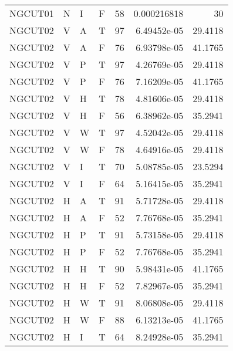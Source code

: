 \begin{longtable}{llllrrr}
    NGCUT01  & N         & I         & F          & 58         & 0.000216818 & 30       \\
    NGCUT02  & V         & A         & T          & 97         & 6.49452e-05 & 29.4118  \\
    NGCUT02  & V         & A         & F          & 76         & 6.93798e-05 & 41.1765  \\
    NGCUT02  & V         & P         & T          & 97         & 4.26769e-05 & 29.4118  \\
    NGCUT02  & V         & P         & F          & 76         & 7.16209e-05 & 41.1765  \\
    NGCUT02  & V         & H         & T          & 78         & 4.81606e-05 & 29.4118  \\
    NGCUT02  & V         & H         & F          & 56         & 6.38962e-05 & 35.2941  \\
    NGCUT02  & V         & W         & T          & 97         & 4.52042e-05 & 29.4118  \\
    NGCUT02  & V         & W         & F          & 78         & 4.64916e-05 & 29.4118  \\
    NGCUT02  & V         & I         & T          & 70         & 5.08785e-05 & 23.5294  \\
    NGCUT02  & V         & I         & F          & 64         & 5.16415e-05 & 35.2941  \\
    NGCUT02  & H         & A         & T          & 91         & 5.71728e-05 & 29.4118  \\
    NGCUT02  & H         & A         & F          & 52         & 7.76768e-05 & 35.2941  \\
    NGCUT02  & H         & P         & T          & 91         & 5.73158e-05 & 29.4118  \\
    NGCUT02  & H         & P         & F          & 52         & 7.76768e-05 & 35.2941  \\
    NGCUT02  & H         & H         & T          & 90         & 5.98431e-05 & 41.1765  \\
    NGCUT02  & H         & H         & F          & 52         & 7.82967e-05 & 35.2941  \\
    NGCUT02  & H         & W         & T          & 91         & 8.06808e-05 & 29.4118  \\
    NGCUT02  & H         & W         & F          & 88         & 6.13213e-05 & 41.1765  \\
    NGCUT02  & H         & I         & T          & 64         & 8.24928e-05 & 35.2941  \\

\end{longtable}
